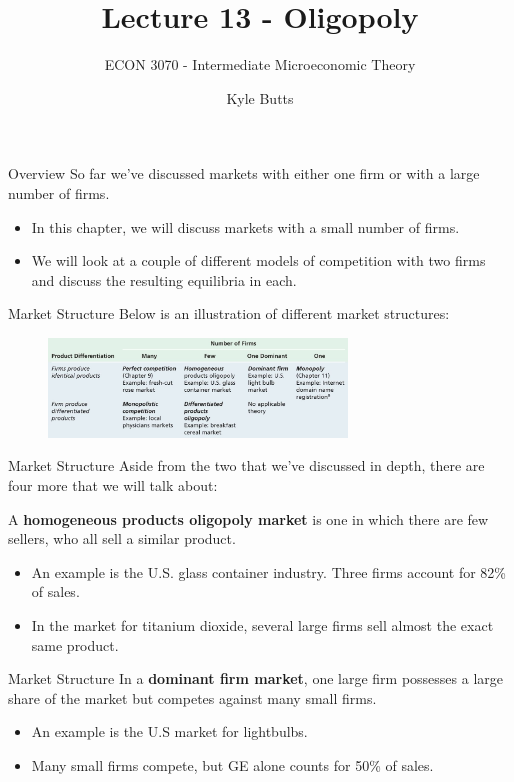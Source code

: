 \documentclass[11pt,t]{beamer}
\author{Kyle Butts}
\title{Lecture 13 - Oligopoly}
\subtitle{ECON 3070 - Intermediate Microeconomic Theory}
\begin{document}
\begin{frame}
  \titlepage
\end{frame}

\begin{frame}{Overview}
  So far we've discussed markets with either one firm or with a large number of firms.

  \begin{itemize}
    \item In this chapter, we will discuss markets with a small number of firms.
    
    \item We will look at a couple of different models of competition with two firms and discuss the resulting equilibria in each.
  \end{itemize}
\end{frame}

\begin{frame}{Market Structure}
  Below is an illustration of different market structures:

  \begin{figure}
    \includegraphics[width=300px]{figures/table13_1.jpg}
  \end{figure}
\end{frame}

\begin{frame}{Market Structure}
  Aside from the two that we've discussed in depth, there are four more that we will talk about:

  \bigskip
   A \textbf{homogeneous products oligopoly market} is one in which there are few sellers, who all sell a similar product.
  \begin{itemize}
    \item An example is the U.S. glass container industry. Three firms account for 82\% of sales.
    \item In the market for titanium dioxide, several large firms sell almost the exact same product.
  \end{itemize}
\end{frame}

\begin{frame}{Market Structure}
   In a \textbf{dominant firm market}, one large firm possesses a large share of the market but competes against many small firms.

  \begin{itemize}
    \item An example is the U.S market for lightbulbs.
    \item Many small firms compete, but GE alone counts for 50\% of sales.
  \end{itemize}
\end{frame}
\end{document}
